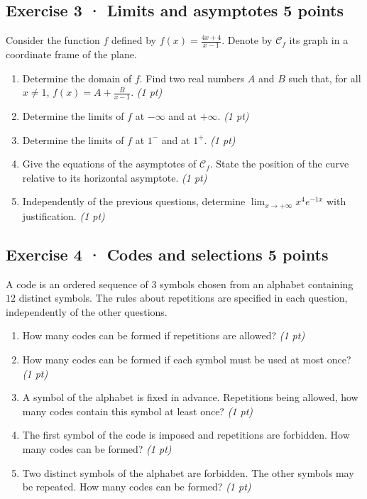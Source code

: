 \subsection*{Exercise 3 · Limits and asymptotes \hfill 5 points}Consider the function $f$ defined by $f(x)=\frac{4x+4}{x-1}$. Denote by $\mathcal C_f$ its graph in a coordinate frame of the plane.

\begin{enumerate}

\item Determine the domain of $f$. Find two real numbers $A$ and $B$ such that, for all $x\ne1$, $f(x)=A+\frac B{x-1}$. \hfill\textit{(1 pt)}

\item Determine the limits of $f$ at $-\infty$ and at $+\infty$. \hfill\textit{(1 pt)}

\item Determine the limits of $f$ at $1^-$ and at $1^+$. \hfill\textit{(1 pt)}

\item Give the equations of the asymptotes of $\mathcal C_f$. State the position of the curve relative to its horizontal asymptote. \hfill\textit{(1 pt)}

\item Independently of the previous questions, determine $\displaystyle\lim_{x\to+\infty}x^{4}e^{-1x}$ with justification. \hfill\textit{(1 pt)}

\end{enumerate}

\subsection*{Exercise 4 · Codes and selections \hfill 5 points}A code is an ordered sequence of $3$ symbols chosen from an alphabet containing $12$ distinct symbols. The rules about repetitions are specified in each question, independently of the other questions.

\begin{enumerate}

\item How many codes can be formed if repetitions are allowed? \hfill\textit{(1 pt)}

\item How many codes can be formed if each symbol must be used at most once? \hfill\textit{(1 pt)}

\item A symbol of the alphabet is fixed in advance. Repetitions being allowed, how many codes contain this symbol at least once? \hfill\textit{(1 pt)}

\item The first symbol of the code is imposed and repetitions are forbidden. How many codes can be formed? \hfill\textit{(1 pt)}

\item Two distinct symbols of the alphabet are forbidden. The other symbols may be repeated. How many codes can be formed? \hfill\textit{(1 pt)}

\end{enumerate}

